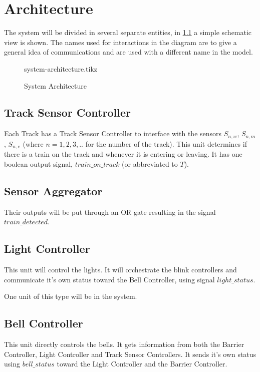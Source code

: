 \documentclass[final]{report}
\begin{document}
\chapter{Architecture}
\label{ch:architecture}
The system will be divided in several separate entities, in \cref{fig:system-architecture} a simple schematic view is shown.
The names used for interactions in the diagram are to give a general idea of communications and are used with a different name in the model.

\begin{figure}[H]
	\centering
	{system-architecture.tikz}
	\caption{System Architecture}
	\label{fig:system-architecture}
\end{figure}

\section{Track Sensor Controller}\label{sec:architecture-sensor-controller}
Each Track has a Track Sensor Controller to interface with the sensors $S_{n,w}$, $S_{n,m}$, $S_{n,e}$ (where $n = 1,2,3,..$ for the number of the track).
This unit determines if there is a train on the track and whenever it is entering or leaving.
It has one boolean output signal, $train\_on\_track$ (or abbreviated to $T$).


\section{Sensor Aggregator}\label{sec:architecture-sensor-aggregator}
Their outputs will be put through an OR gate resulting in the signal $train\_detected$.

\section{Light Controller}\label{sec:architecture-light-controller}
This unit will control the lights.
It will orchestrate the blink controllers and communicate it's own status toward the Bell Controller, using signal $light\_status$.

One unit of this type will be in the system.

\section{Bell Controller}\label{sec:architecture-bell-controller}
This unit directly controls the bells.
It gets information from both the Barrier Controller, Light Controller and Track Sensor Controllers.
It sends it's own status using $bell\_status$ toward the Light Controller and the Barrier Controller.
\end{document}
